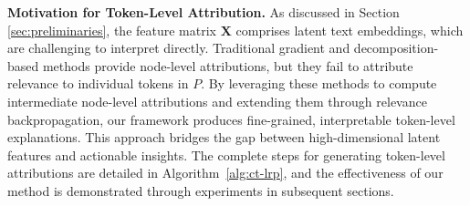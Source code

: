 \textbf{Motivation for Token-Level Attribution.} 
As discussed in Section \ref{sec:preliminaries}, the feature matrix \( \mathbf{X} \) comprises latent text embeddings, which are challenging to interpret directly. Traditional gradient and decomposition-based methods provide node-level attributions, but they fail to attribute relevance to individual tokens in \( P \). By leveraging these methods to compute intermediate node-level attributions and extending them through relevance backpropagation, our framework produces fine-grained, interpretable token-level explanations. This approach bridges the gap between high-dimensional latent features and actionable insights. The complete steps for generating token-level attributions are detailed in Algorithm~\ref{alg:ct-lrp}, and the effectiveness of our method is demonstrated through experiments in subsequent sections.





